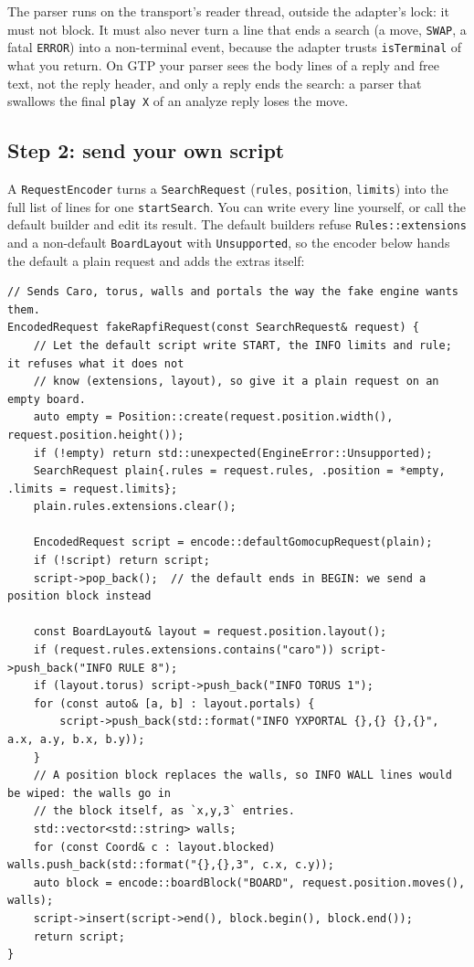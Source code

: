 \documentclass[11pt,a4paper]{article}
\newcommand{\code}[1]{\texttt{#1}}
\begin{document}
\noindent The parser runs on the transport's reader thread, outside the adapter's lock: it must
not block. It must also never turn a line that ends a search (a move, \code{SWAP}, a fatal
\code{ERROR}) into a non-terminal event, because the adapter trusts \code{isTerminal} of what you
return. On GTP your parser sees the body lines of a reply and free text, not the reply header, and
only a reply ends the search: a parser that swallows the final \code{play X} of an analyze reply
loses the move.

\subsection{Step 2: send your own script}

A \code{RequestEncoder} turns a \code{SearchRequest} (\code{rules}, \code{position},
\code{limits}) into the full list of lines for one \code{startSearch}. You can write every line
yourself, or call the default builder and edit its result. The default builders refuse
\code{Rules::extensions} and a non-default \code{BoardLayout} with \code{Unsupported}, so the
encoder below hands the default a plain request and adds the extras itself:

\begin{lstlisting}
// Sends Caro, torus, walls and portals the way the fake engine wants them.
EncodedRequest fakeRapfiRequest(const SearchRequest& request) {
    // Let the default script write START, the INFO limits and rule; it refuses what it does not
    // know (extensions, layout), so give it a plain request on an empty board.
    auto empty = Position::create(request.position.width(), request.position.height());
    if (!empty) return std::unexpected(EngineError::Unsupported);
    SearchRequest plain{.rules = request.rules, .position = *empty, .limits = request.limits};
    plain.rules.extensions.clear();

    EncodedRequest script = encode::defaultGomocupRequest(plain);
    if (!script) return script;
    script->pop_back();  // the default ends in BEGIN: we send a position block instead

    const BoardLayout& layout = request.position.layout();
    if (request.rules.extensions.contains("caro")) script->push_back("INFO RULE 8");
    if (layout.torus) script->push_back("INFO TORUS 1");
    for (const auto& [a, b] : layout.portals) {
        script->push_back(std::format("INFO YXPORTAL {},{} {},{}", a.x, a.y, b.x, b.y));
    }
    // A position block replaces the walls, so INFO WALL lines would be wiped: the walls go in
    // the block itself, as `x,y,3` entries.
    std::vector<std::string> walls;
    for (const Coord& c : layout.blocked) walls.push_back(std::format("{},{},3", c.x, c.y));
    auto block = encode::boardBlock("BOARD", request.position.moves(), walls);
    script->insert(script->end(), block.begin(), block.end());
    return script;
}
\end{lstlisting}
\end{document}
